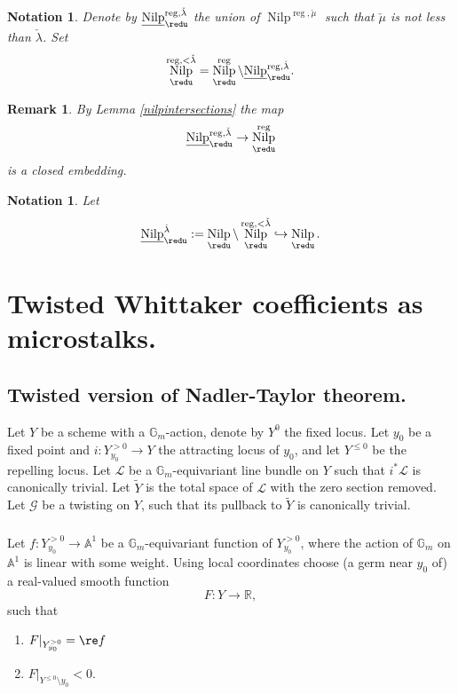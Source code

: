 \documentclass[9pt]{amsart}
\DeclareMathOperator{\reg}{{reg}}
\newcommand{\bA}{{\mathbb A}}
\newcommand{\bG}{{\mathbb G}}
\newcommand{\bR}{{\mathbb R}}
\newcommand{\cG}{{\mathcal G}}
\newcommand{\cL}{{\mathcal L}}
\DeclareMathOperator{\Nilp}{{Nilp}} \DeclareMathOperator{\op}{{op}}
\newtheorem{rem}[subsubsection]{Remark}
\newtheorem{ntn}[subsubsection]{Notation}
\numberwithin{equation}{section}
\begin{document}
\begin{ntn}
	Denote by $\underline{\Nilp}_{\redu}^{\reg, \check{\lambda}}$ the union of $\Nilp^{\reg, \check{\mu}}$ such that $\check{\mu}$ is not less than $\check{\lambda}$.
Set
$$\Nilp_{\redu}^{\reg, <\check{\lambda}} =\Nilp_{\redu}^{\reg} \setminus \underline{\Nilp}_{\redu}^{\reg, \check{\lambda}}.$$
\end{ntn}

\begin{rem}
	By Lemma \ref{nilpintersections} the map $$\underline{\Nilp}_{\redu}^{\reg, \check{\lambda}} \rightarrow \Nilp_{\redu}^{\reg}$$ is a closed embedding.
\end{rem}

\begin{ntn}\label{Nilpgeq}
	Let $$\underline{\Nilp}_{\redu}^{\check{\lambda}}:=\Nilp_{\redu} \setminus \Nilp_{\redu}^{\reg, <\check{\lambda}} \hookrightarrow \Nilp_{\redu}.$$
\end{ntn}

\section{Twisted Whittaker coefficients as microstalks.}\label{NT}


\subsection{Twisted version of Nadler-Taylor theorem.} Let $Y$ be a scheme with a $\bG_m$-action, denote by $Y^0$ the fixed locus.  Let $y_0$ be a fixed point and $i: Y^{>0}_{y_0} \rightarrow Y$ the attracting locus of $y_0$, and let $Y^{\leq 0}$ be the repelling locus. Let $\cL$ be a $\bG_m$-equivariant line bundle on $Y$ such that $i^*\cL$ is canonically trivial. Let  $\widetilde{Y}$ is the total space of $\cL$ with the zero section removed. Let $\cG$ be a twisting on $Y$, such that its pullback to $\widetilde{Y}$ is canonically trivial. 

\subsubsection{} Let $f: Y^{>0}_{y_0} \rightarrow \bA^1$ be a $\bG_m$-equivariant function of $Y^{>0}_{y_0}$, where the action of $\bG_m$ on $\bA^1$ is linear with some weight. Using local coordinates choose (a germ near $y_0$ of) a real-valued smooth function
$$F: Y \rightarrow \bR,$$
such that 
\begin{enumerate}
	\item $F|_{Y^{>0}_{y_0} } = \re f$
	\item $F|_{Y^{\leq 0} \setminus y_0} < 0$.
\end{enumerate}
\end{document}

